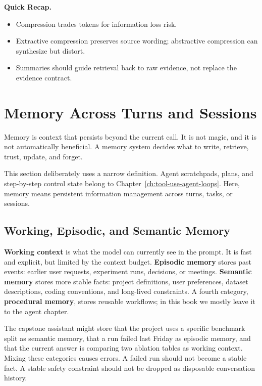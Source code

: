 \begin{quickrecap}
\textbf{Quick Recap.}
\begin{itemize}[nosep,leftmargin=1.5em]
  \item Compression trades tokens for information loss risk.
  \item Extractive compression preserves source wording; abstractive compression can synthesize but distort.
  \item Summaries should guide retrieval back to raw evidence, not replace the evidence contract.
\end{itemize}
\end{quickrecap}


\section{Memory Across Turns and Sessions}
\label{sec:ch20-memory}

Memory is context that persists beyond the current call. It is not magic, and it is not automatically beneficial. A memory system decides what to write, retrieve, trust, update, and forget.

This section deliberately uses a narrow definition. Agent scratchpads, plans, and step-by-step control state belong to Chapter~\ref{ch:tool-use-agent-loops}. Here, memory means persistent information management across turns, tasks, or sessions.

\subsection{Working, Episodic, and Semantic Memory}

\textbf{Working context} is what the model can currently see in the prompt. It is fast and explicit, but limited by the context budget. \textbf{Episodic memory} stores past events: earlier user requests, experiment runs, decisions, or meetings. \textbf{Semantic memory} stores more stable facts: project definitions, user preferences, dataset descriptions, coding conventions, and long-lived constraints. A fourth category, \textbf{procedural memory}, stores reusable workflows; in this book we mostly leave it to the agent chapter.

The capstone assistant might store that the project uses a specific benchmark split as semantic memory, that a run failed last Friday as episodic memory, and that the current answer is comparing two ablation tables as working context. Mixing these categories causes errors. A failed run should not become a stable fact. A stable safety constraint should not be dropped as disposable conversation history.

